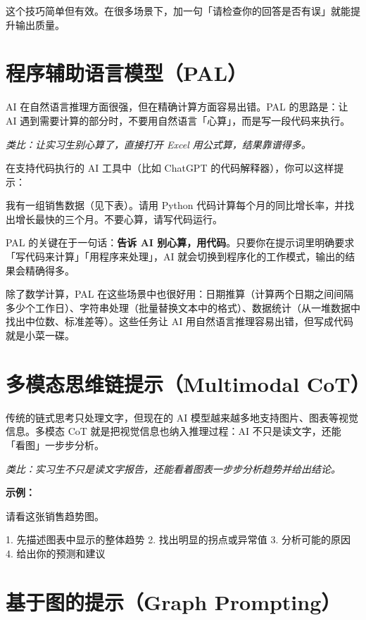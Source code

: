 这个技巧简单但有效。在很多场景下，加一句「请检查你的回答是否有误」就能提升输出质量。

\section{程序辅助语言模型（PAL）}

AI 在自然语言推理方面很强，但在精确计算方面容易出错。PAL 的思路是：让 AI 遇到需要计算的部分时，不要用自然语言「心算」，而是写一段代码来执行。

\textit{类比：让实习生别心算了，直接打开 Excel 用公式算，结果靠谱得多。}

在支持代码执行的 AI 工具中（比如 ChatGPT 的代码解释器），你可以这样提示：

\begin{promptbox}
我有一组销售数据（见下表）。请用 Python 代码计算每个月的同比增长率，并找出增长最快的三个月。不要心算，请写代码运行。
\end{promptbox}

PAL 的关键在于一句话：\textbf{告诉 AI 别心算，用代码}。只要你在提示词里明确要求「写代码来计算」「用程序来处理」，AI 就会切换到程序化的工作模式，输出的结果会精确得多。

除了数学计算，PAL 在这些场景中也很好用：日期推算（计算两个日期之间间隔多少个工作日）、字符串处理（批量替换文本中的格式）、数据统计（从一堆数据中找出中位数、标准差等）。这些任务让 AI 用自然语言推理容易出错，但写成代码就是小菜一碟。

\section{多模态思维链提示（Multimodal CoT）}

传统的链式思考只处理文字，但现在的 AI 模型越来越多地支持图片、图表等视觉信息。多模态 CoT 就是把视觉信息也纳入推理过程：AI 不只是读文字，还能「看图」一步步分析。

\textit{类比：实习生不只是读文字报告，还能看着图表一步步分析趋势并给出结论。}

\textbf{示例：}

\begin{promptbox}
请看这张销售趋势图。

1. 先描述图表中显示的整体趋势
2. 找出明显的拐点或异常值
3. 分析可能的原因
4. 给出你的预测和建议
\end{promptbox}

\section{基于图的提示（Graph Prompting）}

